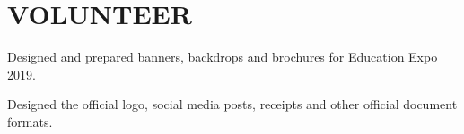 \section{VOLUNTEER}
  \begin{vitemize}
    \item Designed and prepared banners, backdrops and brochures for Education Expo 2019.
    \item Designed the official logo, social media posts, receipts and other official document formats.
  \end{vitemize}
\sectionsep